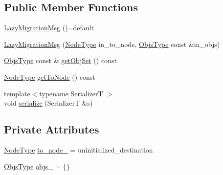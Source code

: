 \subsection*{Public Member Functions}
\begin{DoxyCompactItemize}
\item 
\hyperlink{structvt_1_1vrt_1_1collection_1_1balance_1_1_lazy_migration_msg_a05c45988e43b726f0792e8fb43183036}{Lazy\+Migration\+Msg} ()=default
\item 
\hyperlink{structvt_1_1vrt_1_1collection_1_1balance_1_1_lazy_migration_msg_aa63fe960ff146d67756b83b5e7d529e9}{Lazy\+Migration\+Msg} (\hyperlink{namespacevt_a866da9d0efc19c0a1ce79e9e492f47e2}{Node\+Type} in\+\_\+to\+\_\+node, \hyperlink{structvt_1_1vrt_1_1collection_1_1balance_1_1_lazy_migration_msg_a887ad37dade7ba6fe34e93510cf9cef3}{Objs\+Type} const \&in\+\_\+objs)
\item 
\hyperlink{structvt_1_1vrt_1_1collection_1_1balance_1_1_lazy_migration_msg_a887ad37dade7ba6fe34e93510cf9cef3}{Objs\+Type} const  \& \hyperlink{structvt_1_1vrt_1_1collection_1_1balance_1_1_lazy_migration_msg_ada6a86ba4aa7b806a9088f4ad395458d}{get\+Obj\+Set} () const
\item 
\hyperlink{namespacevt_a866da9d0efc19c0a1ce79e9e492f47e2}{Node\+Type} \hyperlink{structvt_1_1vrt_1_1collection_1_1balance_1_1_lazy_migration_msg_a94b5564dd7432421519a7e07bfa535c5}{get\+To\+Node} () const
\item 
{\footnotesize template$<$typename SerializerT $>$ }\\void \hyperlink{structvt_1_1vrt_1_1collection_1_1balance_1_1_lazy_migration_msg_a58b2680d2acf6ab6da98d421c21f3e20}{serialize} (SerializerT \&s)
\end{DoxyCompactItemize}
\subsection*{Private Attributes}
\begin{DoxyCompactItemize}
\item 
\hyperlink{namespacevt_a866da9d0efc19c0a1ce79e9e492f47e2}{Node\+Type} \hyperlink{structvt_1_1vrt_1_1collection_1_1balance_1_1_lazy_migration_msg_a2faa91a88b04f980a8e74d921cebfb14}{to\+\_\+node\+\_\+} = uninitialized\+\_\+destination
\item 
\hyperlink{structvt_1_1vrt_1_1collection_1_1balance_1_1_lazy_migration_msg_a887ad37dade7ba6fe34e93510cf9cef3}{Objs\+Type} \hyperlink{structvt_1_1vrt_1_1collection_1_1balance_1_1_lazy_migration_msg_aebb8293a1833db126d75d2ec570bb591}{objs\+\_\+} = \{\}
\end{DoxyCompactItemize}

